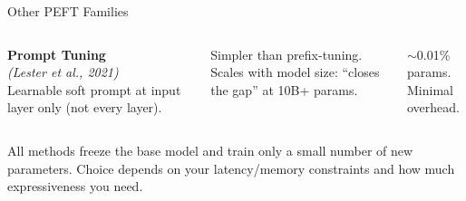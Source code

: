 \documentclass[aspectratio=169]{beamer}
\begin{document}
\begin{frame}{Other PEFT Families}
\begin{columns}[t]
    \textbf{\color{NoteGray}Prompt Tuning}\\
    \scriptsize\textit{(Lester et al., 2021)}\\[4pt]
    \footnotesize
    Learnable soft prompt at input layer only (not every layer).

    \vspace{4pt}
    Simpler than prefix-tuning.\\
    Scales with model size: ``closes the gap'' at 10B+ params.

    \vspace{4pt}
    $\sim$0.01\% params.\\
    Minimal overhead.
  \end{columns}

  \vspace{8pt}
  {\footnotesize\color{NoteGray} All methods freeze the base model and train only a small number of new parameters. Choice depends on your latency/memory constraints and how much expressiveness you need.}

  \end{frame}
\end{document}
